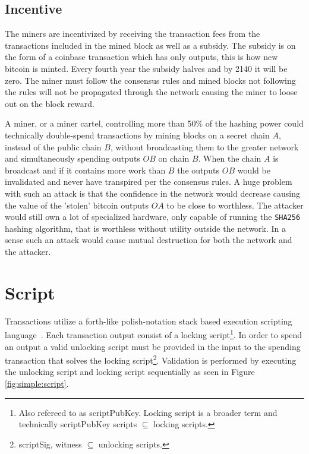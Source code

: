 \subsection{Incentive}

The miners are incentivized by receiving the transaction fees from the transactions included in the mined block as well as a subsidy. The subsidy is on the form of a coinbase transaction which has only outputs, this is how new bitcoin is minted. Every fourth year the subsidy halves and by 2140 it will be zero. The miner must follow the consensus rules and mined blocks not following the rules will not be propagated through the network causing the miner to loose out on the block reward.

A \gls{miner}, or a miner cartel, controlling more than 50\% of the hashing power could technically double-spend transactions by mining blocks on a secret chain $A$, instead of the public chain $B$, without broadcasting them to the greater network and simultaneously spending outputs $OB$ on chain $B$. When the chain $A$ is broadcast and if it contains more work than $B$ the outputs $OB$ would be invalidated and never have transpired per the consensus rules. A huge problem with such an attack is that the confidence in the network would decrease causing the value of the 'stolen' bitcoin outputs $OA$ to be close to worthless. The attacker would still own a lot of specialized hardware, only capable of running the \texttt{SHA256} hashing algorithm, that is worthless without utility outside the network. In a sense such an attack would cause mutual destruction for both the network and the attacker. 

\section{Script}
\label{sec:script}

Transactions utilize a forth-like polish-notation stack based execution scripting language~\cite{antonopoulos:mastering:bitcoin}. Each transaction output consist of a locking script\footnote{Also refereed to as scriptPubKey. Locking script is a broader term and technically scriptPubKey scripts $ \subseteq $ locking scripts.}. In order to spend an output a valid unlocking script must be provided in the input to the spending transaction that solves the locking script\footnote{scriptSig, witness $\subseteq $ unlocking scripts.}. Validation is performed by executing the unlocking script and locking script sequentially as seen in Figure \ref{fig:simple:script}. 

